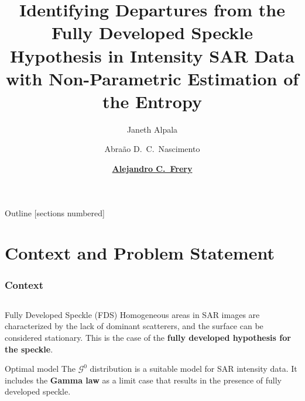 \documentclass[aspectratio=169,10pt]{beamer}
\title{ Identifying Departures from the Fully Developed Speckle Hypothesis in Intensity SAR Data with Non-Parametric Estimation of the Entropy}
\author{Janeth Alpala \and Abraão D.~C.~Nascimento \and \textbf{\underline{Alejandro C.~Frery}}}
\date{\textcolor{black}{}}
\begin{document}
\maketitle
\begin{frame}{Outline}
  [sections numbered]
  \tableofcontents[hideallsubsections]
\end{frame}
\section{Context and Problem Statement}
\begin{frame} \frametitle{\large{Context}}\vspace{-0.3cm}	

 \justifying
\begin{columns}[T,onlytextwidth]
    \begin{column}{.55\textwidth}
			\begin{alertblock}{Fully Developed Speckle (FDS)}\justifying
			\vspace{0.4cm}	
Homogeneous areas in SAR images are characterized by the lack of dominant scatterers, and the surface can be considered stationary.
This is the case of the \textbf{fully developed hypothesis for the speckle}.

		 \vspace{0.4cm}	
	\end{alertblock}
	\begin{alertblock}{Optimal model}\justifying
	\vspace{0.2cm}	
		The \(\mathcal{G}^0\) distribution is a suitable model for SAR intensity data. %
		It includes the \textbf{Gamma law} as a limit case that results in the presence of fully developed speckle.


	\end{alertblock}
		

\end{column}
\end{columns}
\end{frame}
\end{document}
